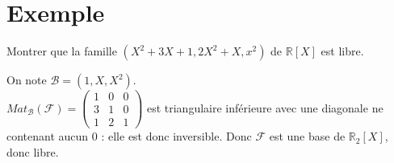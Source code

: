 \documentclass[../main.tex]{subfiles}
\begin{document}
\section{Exemple}
\begin{tcolorbox}[title=Exemple 28.6, title filled=false, colframe=darkgreen, colback=darkgreen!10!white]
    Montrer que la famille $(X^2 + 3X + 1, 2X^2 + X, x^2)$ de $\mathbb{R}[X]$ est libre. 
\end{tcolorbox}

\noindent On note $\mathcal{B} = (1, X, X^2)$. \\
$Mat_{\mathcal{B}}(\mathcal{F}) = \begin{pmatrix}
    1 & 0 & 0 \\
    3 & 1 & 0 \\
    1 & 2 & 1
\end{pmatrix}$ est triangulaire inférieure avec une diagonale ne contenant aucun $0$ : elle est donc inversible. Donc $\mathcal{F}$ est une base de $\mathbb{R}_2[X]$, donc libre. 
\end{document}
